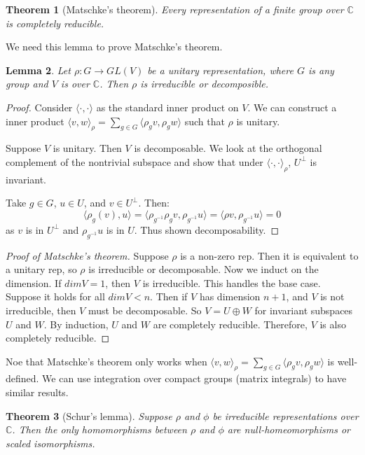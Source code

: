 \documentclass[]{report}
\newtheorem{theorem}{Theorem}
\newtheorem{lemma}[theorem]{Lemma}
\theoremstyle{definition}
\numberwithin{theorem}{section}
\numberwithin{equation}{section}
\begin{document}
\begin{theorem}[Matschke's theorem]
	Every representation of a finite group over $\mathbb{C}$ is completely reducible. 
\end{theorem}


We need this lemma to prove Matschke's theorem.

\begin{lemma}
	Let $\rho : G \rightarrow GL(V)$ be a unitary representation, where $G$ is any group and $V$ is over $\mathbb{C}$. Then $\rho$ is irreducible or decomposible. 
\end{lemma}
\begin{proof}
	Consider $\langle \cdot , \cdot \rangle$ as the standard inner product on $V$. We can construct a inner product
	$\langle v,w \rangle_\rho = \sum_{g \in G} \langle \rho_g v , \rho_g w \rangle$
	such that $\rho$ is unitary.
	
Suppose $V$ is unitary. Then $V$ is decomposable. We look at the orthogonal complement of the nontrivial subspace and show that under $\langle \cdot, \cdot \rangle_\rho$, $U^\bot$ is invariant. 

Take $g \in G$, $u \in U$, and $v \in U^\bot$. 
Then:
\begin{equation}
	\langle \rho_g(v), u \rangle = \langle \rho_{g^{-1}} \rho_g v, \rho_{g^{-1}} u \rangle = \langle \rho v, \rho_{g^{-1}} u \rangle = 0
\end{equation}
as $v$ is in $U^\bot$ and $\rho_{g^{-1}} u$ is in $U$. Thus shown decomposability. 
\end{proof}

\begin{proof}[Proof of Matschke's theorem]
	Suppose $\rho$ is a non-zero rep. Then it is equivalent to a unitary rep, so $\rho$ is irreducible or decomposable. Now we induct on the dimension. If $dim V = 1$, then $V$ is irreducible. This handles the base case. Suppose it holds for all $dim V < n$. Then if $V$ has dimension $n + 1$, and $V$ is not irreducible, then $V$ must be decomposable. So $V = U \oplus W$ for invariant subspaces $U$ and $W$. By induction, $U$ and $W$ are completely reducible. Therefore, $V$ is also completely reducible.
\end{proof}
Noe that Matschke's theorem only works when $\langle v,w \rangle_\rho = \sum_{g \in G} \langle \rho_g v , \rho_g w \rangle$ is well-defined. We can use integration over compact groups (matrix integrals) to have similar results. 


\begin{theorem}[Schur's lemma]
	Suppose $\rho$ and $\phi$ be irreducible representations over $\mathbb{C}$. Then the only homomorphisms between $\rho$ and $\phi$ are null-homeomorphisms or scaled isomorphisms. 
\end{theorem}
\end{document}
